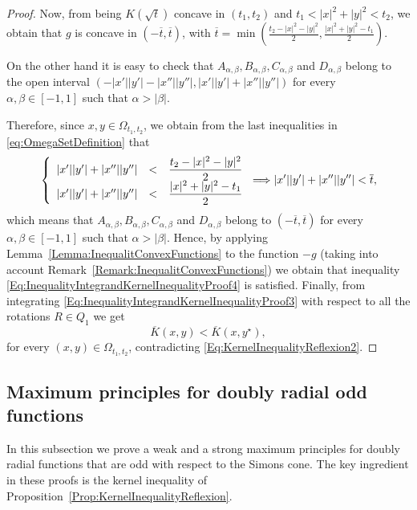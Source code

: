 \begin{proof}
Now, from being $K(\sqrt{t})$ concave in $(t_1,t_2)$ and $t_1<|x|^2+|y|^2<t_2$, we obtain that $g$ is concave in $ \left( -\overline{t}, \overline{t}\right) $, with $\overline{t} = \min{\left(\frac{t_2-|x|^2-|y|^2}{2},\frac{|x|^2+|y|^2-t_1}{2}\right)}$.

On the other hand it is easy to check that $A_{\alpha,\beta}, B_{\alpha,\beta}, C_{\alpha,\beta}$ and $D_{\alpha,\beta}$ belong to the open interval $(-|x'||y'|-|x''||y''|,|x'||y'|+|x''||y''|)$ for every $\alpha, \beta \in [-1,1]$ such that $\alpha>|\beta|$.

Therefore, since $x,y \in \Omega_{t_1,t_2}$, we obtain from the last inequalities in \eqref{eq:OmegaSetDefinition} that
$$
\left\{\begin{array}{rcll}
  |x'||y'|+|x''||y''|&<&\dfrac{t_2-|x|^2-|y|^2}{2}\\
  |x'||y'|+|x''||y''|&<&\dfrac{|x|^2+|y|^2-t_1}{2}
\end{array} \right. \Longrightarrow  |x'||y'|+|x''||y''|<\overline{t},
$$
which means that $A_{\alpha,\beta}, B_{\alpha,\beta}, C_{\alpha,\beta}$ and $D_{\alpha,\beta}$ belong to $(-\overline{t},\overline{t})$ for every $\alpha, \beta \in [-1,1]$ such that $\alpha>|\beta|$.
Hence, by applying Lemma~\ref{Lemma:InequalitConvexFunctions} to the function $-g$ (taking into account Remark~\ref{Remark:InequalitConvexFunctions}) we obtain that inequality \eqref{Eq:InequalityIntegrandKernelInequalityProof4} is satisfied. Finally, from integrating \eqref{Eq:InequalityIntegrandKernelInequalityProof3} with respect to all the rotations $R\in Q_1$ we get
$$ \overline{K}(x,y) < \overline{K}(x, y^\star),$$
for every $(x,y)\in \Omega_{t_1,t_2}$, contradicting \eqref{Eq:KernelInequalityReflexion2}.
\end{proof}

\subsection{Maximum principles for doubly radial odd functions}

In this subsection we prove a weak and a strong maximum principles for doubly radial functions that are odd with respect to the Simons cone. The key ingredient in these proofs is the kernel inequality of Proposition~\ref{Prop:KernelInequalityReflexion}.


